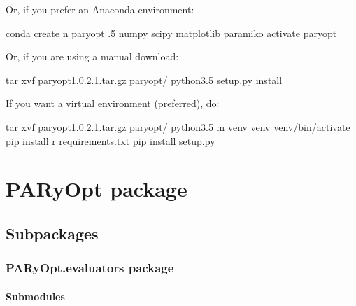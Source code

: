 \documentclass[letterpaper,12pt,english]{sphinxmanual}
\begin{document}
\sphinxAtStartPar
Or, if you prefer an Anaconda environment:

\begin{sphinxVerbatim}[commandchars=\\\{\}]
conda create \PYGZhy{}n paryopt .5 numpy scipy matplotlib paramiko
activate paryopt
\end{sphinxVerbatim}

\sphinxAtStartPar
Or, if you are using a manual download:

\begin{sphinxVerbatim}[commandchars=\\\{\}]
tar \PYGZhy{}xvf paryopt\PYGZhy{}1.0.2.1.tar.gz
 paryopt/
python3.5 setup.py install
\end{sphinxVerbatim}

\sphinxAtStartPar
If you want a virtual environment (preferred), do:

\begin{sphinxVerbatim}[commandchars=\\\{\}]
tar \PYGZhy{}xvf paryopt\PYGZhy{}1.0.2.1.tar.gz
 paryopt/
python3.5 \PYGZhy{}m venv venv
 venv/bin/activate
pip install \PYGZhy{}r requirements.txt
pip install setup.py
\end{sphinxVerbatim}


\chapter{PARyOpt package}
\label{\detokenize{PARyOpt:paryopt-package}}\label{\detokenize{PARyOpt::doc}}

\section{Subpackages}
\label{\detokenize{PARyOpt:subpackages}}

\subsection{PARyOpt.evaluators package}
\label{\detokenize{PARyOpt.evaluators:paryopt-evaluators-package}}\label{\detokenize{PARyOpt.evaluators::doc}}

\subsubsection{Submodules}
\label{\detokenize{PARyOpt.evaluators:submodules}}
\end{document}
